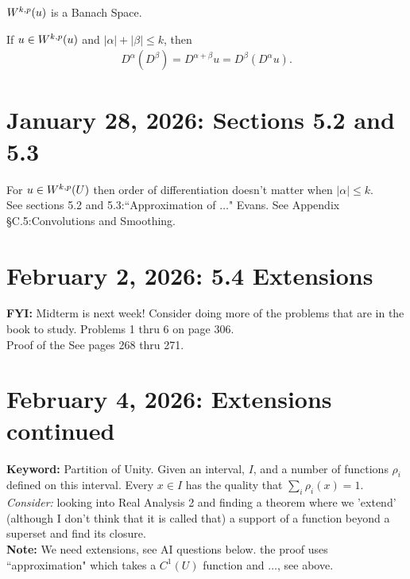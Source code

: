 \documentclass[12pt,a4paper]{report}
\begin{document}
\begin{theorem}
	${W^{k,p}(u)}$ is a Banach Space.
\end{theorem}

\begin{theorem}
	If $u \in {W^{k,p}(u)}$ and $|\alpha|+|\beta| \le k$, then 
	\begin{align*}
		D^\alpha(D^\beta) = D^{\alpha+\beta} u = D^\beta(D^\alpha u).
	\end{align*}
\end{theorem}

\HLINE
\section*{January 28, 2026: Sections 5.2 and 5.3} 

For $u \in {W^{k,p}(U)}$ then order of differentiation doesn't matter when $|\alpha| \le k$.\\

See sections 5.2 and 5.3:``Approximation of $\dots$" Evans.  See Appendix \S C.5:Convolutions and Smoothing.\\

\HLINE
\section*{February 2, 2026: 5.4 Extensions}

\textbf{FYI: } Midterm is next week!  Consider doing more of the problems that are in the book to study.  Problems 1 thru 6 on page 306.\\

Proof of the   See pages 268 thru 271.

\HLINE
\section*{February 4, 2026: Extensions continued}

\textbf{Keyword:}  Partition of Unity.  Given an interval, $I$, and a number of functions $\rho_i$ defined on this interval.  Every $x\in I$ has the quality that $\sum_i \rho_i(x) = 1$.\\

\textit{Consider: }looking into Real Analysis 2 and finding a theorem where we 'extend' (although I don't think that it is called that) a support of a function beyond a superset and find its closure.\\

\textbf{Note: }We need extensions, see AI questions below.  the proof uses ``approximation" which takes a $C^1(U)$ function and $\dots$, see above.
\end{document}

